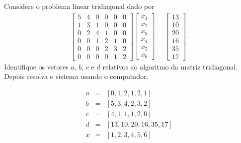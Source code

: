 \begin{exer} Considere o problema linear tridiagonal dado por
\begin{eqnarray} \begin{bmatrix}
   { 5  } & { 4 } & { 0 } & { 0 } & { 0 } & { 0 } \\    
   { 1  } & { 3 } & { 1 } & { 0 } & { 0 } & { 0 } \\
   { 0  } & { 2 } & { 4 } & { 1 } & { 0 } & { 0 } \\
   { 0  } & { 0 } & { 1 } & { 2 } & { 1 } & { 0 } \\
   { 0  } & { 0 } & { 0 } & { 2 } & { 3 } & { 2 } \\
   { 0  } & { 0 } & { 0 } & { 0 } & { 1 } & { 2 } 
    \end{bmatrix}
\begin{bmatrix}
   {x_1 }  \\
   {x_2 }  \\
   {x_3 }  \\
   {x_4 }  \\
   {x_5 }  \\
   {x_6}  
\end{bmatrix}
=
\begin{bmatrix}
   {13}  \\
   {10 }  \\
   {20}  \\
   {16}\\
   {35}\\
   {17}
\end{bmatrix}
.
\end{eqnarray}
 Identifique os vetores $a$, $b$, $c$ e $d$  relativos ao algoritmo da matriz tridiagonal. Depois resolva o sistema usando o computador.
\end{exer}

\begin{resp}
 \begin{eqnarray*}
  a&=&[0, 1, 2, 1, 2, 1]\\ 
  b&=&[5, 3, 4, 2, 3, 2]\\
  c&=&[4, 1, 1, 1, 2, 0]\\
  d&=&[13, 10, 20, 16, 35, 17]\\
  x&=&[1, 2, 3, 4, 5, 6]
 \end{eqnarray*}
\end{resp}

